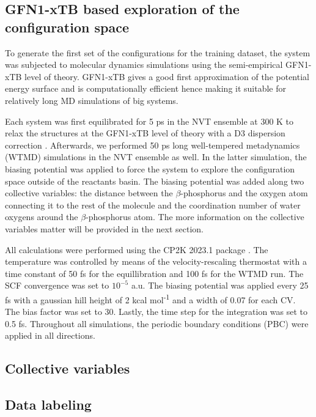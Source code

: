 \subsection{GFN1-xTB based exploration of the configuration space}
To generate the first set of the configurations for the training dataset, the system was subjected to molecular dynamics simulations using the semi-empirical GFN1-xTB \citep{grimme_robust_2017} level of theory. GFN1-xTB gives a good first approximation of the potential energy surface and is computationally efficient hence making it suitable for relatively long MD simulations of big systems. 

Each system was first equilibrated for 5 ps in the NVT ensemble at 300 K to relax the structures at the GFN1-xTB level of theory with a D3 dispersion correction \citep{grimme_consistent_2010}. Afterwards, we performed 50 ps long well-tempered metadynamics (WTMD) simulations in the NVT ensemble as well. In the latter simulation, the biasing potential was applied to force the system to explore the configuration space outside of the reactants basin. The biasing potential was added along two collective variables: the distance between the $\beta$-phosphorus and the oxygen atom connecting it to the rest of the molecule and the coordination number of water oxygens around the $\beta$-phosphorus atom. The more information on the collective variables matter will be provided in the next section. 

All calculations were performed using the CP2K 2023.1 package \citep{kuhne_cp2k_2020}. The temperature was controlled by means of the velocity-rescaling thermostat \citep{bussi_canonical_2007} with a time constant of 50 fs for the equillibration and 100 fs for the WTMD run. The SCF convergence was set to $10^{-5}$ a.u. The biasing potential was applied every 25 fs with a gaussian hill height of 2 kcal mol\textsuperscript{-1} and a width of 0.07 for each CV. The bias factor was set to 30. Lastly, the time step for the integration was set to 0.5 fs. Throughout all simulations, the periodic boundary conditions (PBC) were applied in all directions.



\subsection{Collective variables}

\subsection{Data labeling}

